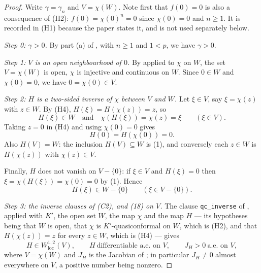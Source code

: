 \begin{proof}
Write $\gamma=\gamma_n$ and $V=\chi(W)$.  Note first that $f(0)=0$ is also a
consequence of (H2): $f(0)=\chi(0)^{n}=0$ since $\chi(0)=0$ and $n\ge1$.  It is
recorded in (H1) because the paper states it, and is not used separately below.

\emph{Step 0: $\gamma>0$.}  By part (a) of , with
$n\ge1$ and $1<p$, we have $\gamma>0$.

\emph{Step 1: $V$ is an open neighbourhood of $0$.}  By
 applied to $\chi$ on $W$, the set $V=\chi(W)$ is
open, $\chi$ is injective and continuous on $W$.  Since $0\in W$ and
$\chi(0)=0$, we have $0=\chi(0)\in V$.

\emph{Step 2: $H$ is a two-sided inverse of $\chi$ between $V$ and $W$.}  Let
$\xi\in V$, say $\xi=\chi(z)$ with $z\in W$.  By (H4), $H(\xi)=H(\chi(z))=z$,
so
\begin{equation}\tag{1}
  H(\xi)\in W\quad\text{and}\quad \chi(H(\xi))=\chi(z)=\xi
  \qquad(\xi\in V).
\end{equation}
Taking $z=0$ in (H4) and using $\chi(0)=0$ gives
\begin{equation}\tag{2}
  H(0)=H(\chi(0))=0 .
\end{equation}
Also $H(V)=W$: the inclusion $H(V)\subseteq W$ is (1), and conversely each
$z\in W$ is $H(\chi(z))$ with $\chi(z)\in V$.

Finally, $H$ does not vanish on $V-\{0\}$: if $\xi\in V$ and $H(\xi)=0$ then
$\xi=\chi(H(\xi))=\chi(0)=0$ by (1).  Hence
\begin{equation}\tag{3}
  H(\xi)\in W-\{0\}\qquad(\xi\in V-\{0\}).
\end{equation}

\emph{Step 3: the inverse clauses of (C2), and (18) on $V$.}  The clause
\texttt{qc\_inverse} of , applied with $K'$, the open set
$W$, the map $\chi$ and the map $H$ --- its hypotheses being that $W$ is open,
that $\chi$ is $K'$-quasiconformal on $W$, which is (H2), and that
$H(\chi(z))=z$ for every $z\in W$, which is (H4) --- gives
\begin{equation}\tag{3$'$}
  H\in W^{1,2}_{\mathrm{loc}}(V),\qquad
  H\ \text{differentiable a.e. on }V,\qquad
  J_H>0\ \text{a.e. on }V,
\end{equation}
where $V=\chi(W)$ and $J_H$ is the Jacobian of ; in particular
$J_H\neq0$ almost everywhere on $V$, a positive number being nonzero.


\end{proof}
